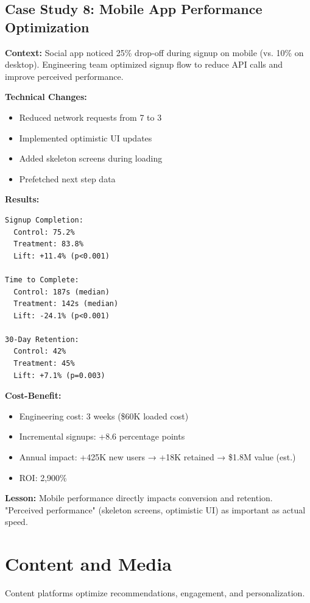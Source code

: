 \subsection{Case Study 8: Mobile App Performance Optimization}

\textbf{Context:} Social app noticed 25\% drop-off during signup on mobile (vs. 10\% on desktop). Engineering team optimized signup flow to reduce API calls and improve perceived performance.

\textbf{Technical Changes:}
\begin{itemize}
    \item Reduced network requests from 7 to 3
    \item Implemented optimistic UI updates
    \item Added skeleton screens during loading
    \item Prefetched next step data
\end{itemize}

\textbf{Results:}
\begin{verbatim}
Signup Completion:
  Control: 75.2%
  Treatment: 83.8%
  Lift: +11.4% (p<0.001)

Time to Complete:
  Control: 187s (median)
  Treatment: 142s (median)
  Lift: -24.1% (p<0.001)

30-Day Retention:
  Control: 42%
  Treatment: 45%
  Lift: +7.1% (p=0.003)
\end{verbatim}

\textbf{Cost-Benefit:}
\begin{itemize}
    \item Engineering cost: 3 weeks (\$60K loaded cost)
    \item Incremental signups: +8.6 percentage points
    \item Annual impact: +425K new users → +18K retained → \$1.8M value (est.)
    \item ROI: 2,900\%
\end{itemize}

\textbf{Lesson:} Mobile performance directly impacts conversion and retention. "Perceived performance" (skeleton screens, optimistic UI) as important as actual speed.

\section{Content and Media}

Content platforms optimize recommendations, engagement, and personalization.

